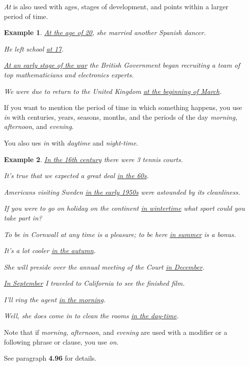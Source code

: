 \documentclass[oneside]{book}
\numberwithin{equation}{section}
\newtheorem{example}{Example}[section]
\begin{document}
%
\noindent{} \textit{At} is also used with ages, stages of development, and points within a larger period of time.
\begin{example}
    \underline{At the age of 20}, she married another Spanish dancer.
    
    He left school \underline{at 17}.
    
    \underline{At an early stage of the war} the British Government began recruiting a team of top mathematicians and electronics experts.
    
    We were due to return to the United Kingdom \underline{at the beginning of March}.
\end{example}
%
\noindent{} If you want to mention the period of time in which something happens, you use \textit{in} with centuries, years, seasons, months, and the periods of the day \textit{morning, afternoon}, and \textit{evening}.

You also ues \textit{in} with \textit{daytime} and \textit{night-time}.
\begin{example}
    \underline{In the 16th century} there were 3 tennis courts.
    
    It's true that we expected a great deal \underline{in the 60s}.
    
    Americans visiting Sweden \underline{in the early 1950s} were astounded by its cleanliness.
    
    If you were to go on holiday on the continent \underline{in wintertime} what sport could you take part in?
    
    To be in Cornwall at any time is a pleasure; to be here \underline{in summer} is a bonus.
    
    It's a lot cooler \underline{in the autumn}.
    
    She will preside over the annual meeting of the Court \underline{in December}.
    
    \underline{In September} I traveled to California to see the finished film.
    
    I'll ring the agent \underline{in the morning}.
    
    Well, she does come in to clean the rooms \underline{in the day-time}.
\end{example}
Note that if \textit{morning, afternoon}, and \textit{evening} are used with a modifier or a following phrase or clause, you use \textit{on}.

See paragraph \textbf{4.96} for details.
\end{document}
